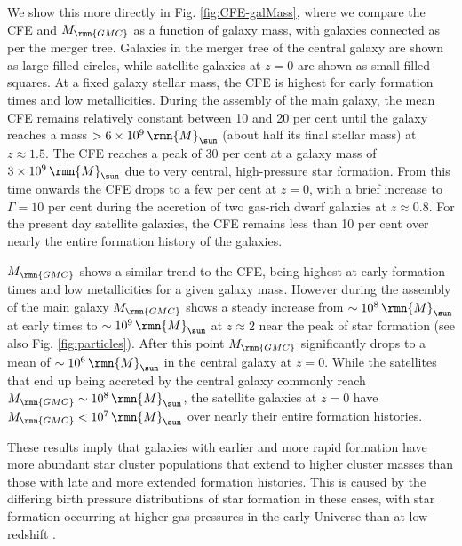 \documentclass[fleqn,usenatbib]{mnras}
\newcommand\Msun{\,\rmn{M}_{\sun}}
\newcommand{\Mgmc}{M_\rmn{GMC}}
\begin{document}
We show this more directly in Fig. \ref{fig:CFE-galMass}, where we compare the CFE and $\Mgmc$ as a function of galaxy mass, with galaxies connected as per the merger tree. Galaxies in the merger tree of the central galaxy are shown as large filled circles, while satellite galaxies at $z=0$ are shown as small filled squares.
At a fixed galaxy stellar mass, the CFE is highest for early formation times and low metallicities. 
During the assembly of the main galaxy, the mean CFE remains relatively constant between 10 and 20 per cent until the galaxy reaches a mass $>6\times10^9 \Msun$ (about half its final stellar mass) at $z\approx1.5$. The CFE reaches a peak of 30 per cent at a galaxy mass of $3\times 10^9 \Msun$ due to very central, high-pressure star formation. From this time onwards the CFE drops to a few per cent at $z=0$, with a brief increase to $\Gamma=10$ per cent during the accretion of two gas-rich dwarf galaxies at $z\approx0.8$. 
For the present day satellite galaxies, the CFE remains less than 10 per cent over nearly the entire formation history of the galaxies.

$\Mgmc$ shows a similar trend to the CFE, being highest at early formation times and low metallicities for a given galaxy mass. However during the assembly of the main galaxy $\Mgmc$ shows a steady increase from $\sim10^8 \Msun$ at early times to $\sim10^9 \Msun$ at $z\approx2$ near the peak of star formation (see also Fig. \ref{fig:particles}). After this point $\Mgmc$ significantly drops to a mean of $\sim10^6 \Msun$ in the central galaxy at $z=0$. While the satellites that end up being accreted by the central galaxy commonly reach $\Mgmc\sim10^8 \Msun$, the satellite galaxies at $z=0$ have $\Mgmc < 10^7 \Msun$ over nearly their entire formation histories.

These results imply that galaxies with earlier and more rapid formation have more abundant star cluster populations that extend to higher cluster masses than those with late and more extended formation histories. This is caused by the differing birth pressure distributions of star formation in these cases, with star formation occurring at higher gas pressures in the early Universe than at low redshift \citep[see also][]{Mistani_et_al_16}. 
\end{document}
